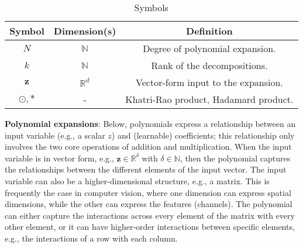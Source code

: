 \documentclass[runningheads]{llncs}
\newcommand{\realnum}{\mathbb{R}}
\providecommand{\naturalnum}{\mathbb{N}}
\providecommand{\invar}{z}
\providecommand{\binvar}{\bm{\invar}}
\providecommand\eg{e.g.,}
\begin{document}
\begin{table}[]
    \caption{Symbols}
    \label{tbl:nosharing_primary_symbols}
    \centering
    \begin{tabular}{|c | c | c|}
    \toprule
    Symbol 	& Dimension(s) 		&	Definition \\
    \midrule
    $N$ 		            & $\naturalnum$		            &	Degree of polynomial expansion. \\
    $k$ 		            & $\naturalnum$		            & Rank of the decompositions. \\
    $\binvar$            & $\realnum^d$                      & Vector-form input to the expansion. \\
    $\odot, *$          &   -       & Khatri-Rao product, Hadamard product. \\
     \hline
    \end{tabular}
\end{table}



 

\noindent\textbf{Polynomial expansions}: Below, 
polynomials express a relationship between an input variable (\eg{} a scalar $\invar$) and (learnable) coefficients; this relationship only involves the two core operations of addition and multiplication. 
When the input variable is in vector form, \eg{} $\binvar \in \realnum^\delta$ with $\delta \in \naturalnum$, then the polynomial captures the relationships between the different elements of the input vector. 
The input variable can also be a higher-dimensional structure, \eg{} a matrix. This is frequently the case in computer vision, where one dimension can express spatial dimensions, while the other can express the features (channels). The polynomial can either capture the interactions across every element of the matrix with every  other element, or it can have higher-order interactions between specific elements, \eg{} the interactions of a row with each column.
\end{document}
